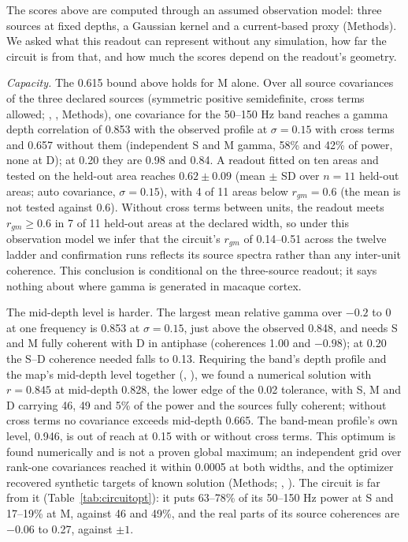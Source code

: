 The scores above are computed through an assumed observation model: three sources at fixed depths, a Gaussian
kernel and a current-based proxy (Methods). We asked what this readout can represent without any simulation, how
far the circuit is from that, and how much the scores depend on the readout's geometry.

\textit{Capacity.} The 0.615 bound above holds for M alone. Over all source covariances of the three declared
sources (symmetric positive semidefinite, cross terms allowed; , , Methods), one covariance for the
50--150 Hz band reaches a gamma depth correlation of 0.853 with the observed profile at $\sigma = 0.15$ with cross
terms and 0.657 without them (independent S and M gamma, 58\% and 42\% of power, none at D); at 0.20 they are 0.98
and 0.84. A readout fitted on ten areas and tested on the held-out area reaches $0.62 \pm 0.09$ (mean $\pm$ SD over $n = 11$ held-out areas; auto covariance, $\sigma = 0.15$), with 4 of 11 areas below $r_{gm} = 0.6$ (the mean is not tested against 0.6). Without cross terms between units, the readout meets $r_{gm} \geq 0.6$ in 7 of 11 held-out areas at the declared width,
so under this observation model we infer that the circuit's $r_{gm}$ of 0.14--0.51 across the twelve ladder and confirmation runs reflects its source spectra rather than any
inter-unit coherence. This conclusion is conditional on the three-source readout; it says nothing about where gamma
is generated in macaque cortex.

The mid-depth level is harder. The largest mean relative gamma over $-0.2$ to 0 at one frequency is 0.853 at
$\sigma = 0.15$, just above the observed 0.848, and needs S and M fully coherent with D in antiphase (coherences
1.00 and $-0.98$); at 0.20 the S--D coherence needed falls to 0.13. Requiring the band's depth profile and the
map's mid-depth level together (, ), we found a numerical solution with $r = 0.845$ at mid-depth
0.828, the lower edge of the 0.02 tolerance, with S, M and D carrying 46, 49 and 5\% of the power and the sources
fully coherent; without cross terms no covariance exceeds mid-depth 0.665. The band-mean profile's own level, 0.946,
is out of reach at 0.15 with or without cross terms. This optimum is found numerically and is not a proven global
maximum; an independent grid over rank-one covariances reached it within 0.0005 at both widths, and the optimizer recovered
synthetic targets of known solution (Methods; , ). The circuit is far from it
(Table~\ref{tab:circuitopt}): it puts 63--78\% of its 50--150 Hz power at S and 17--19\% at M, against 46 and 49\%,
and the real parts of its source coherences are $-0.06$ to 0.27, against $\pm 1$.

